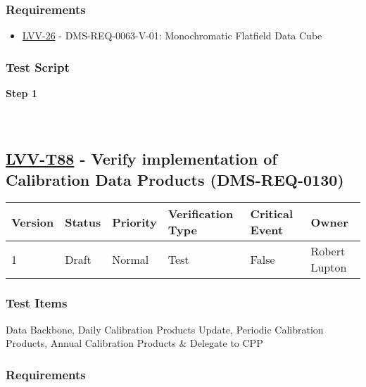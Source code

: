 \hypertarget{requirements-64}{%
\subsubsection{Requirements}\label{requirements-64}}

\begin{itemize}
\tightlist
\item
  \href{https://jira.lsstcorp.org/browse/LVV-26}{LVV-26} -
  DMS-REQ-0063-V-01: Monochromatic Flatfield Data Cube
\end{itemize}

\hypertarget{test-script-64}{%
\subsubsection{Test Script}\label{test-script-64}}

\textbf{Step 1}\\
~\\
~\\

\hypertarget{lvv-t88---verify-implementation-of-calibration-data-products-dms-req-0130}{%
\subsection{\texorpdfstring{\href{https://jira.lsstcorp.org/secure/Tests.jspa\#/testCase/LVV-T88}{LVV-T88}
- Verify implementation of Calibration Data Products
(DMS-REQ-0130)}{LVV-T88 - Verify implementation of Calibration Data Products (DMS-REQ-0130)}}\label{lvv-t88---verify-implementation-of-calibration-data-products-dms-req-0130}}

\begin{longtable}[]{@{}llllll@{}}
\toprule
Version & Status & Priority & Verification Type & Critical Event &
Owner\tabularnewline
\midrule
\endhead
1 & Draft & Normal & Test & False & Robert Lupton\tabularnewline
\bottomrule
\end{longtable}

\hypertarget{test-items-64}{%
\subsubsection{Test Items}\label{test-items-64}}

Data Backbone, Daily Calibration Products Update, Periodic Calibration
Products, Annual Calibration Products \& Delegate to CPP

\hypertarget{requirements-65}{%
\subsubsection{Requirements}\label{requirements-65}}

